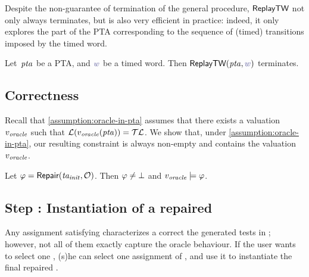 \begin{tikzborder}{\cite{Gargantini16:validation}}
\begin{tikzborder}{\cite{gargantini_combinatorial_2017}}
\begin{tikzborder}{\cite{gargantini_combinatorial_2017}}
\begin{tikzborder}{\cite{garn2019}}
\begin{tikzborder}{\cite{arcaini2019achieving}}
\begin{tikzborder}{\cite{arcaini2019varivolution}}
\begin{tikzborder}{}
\begin{remark}
	Despite the non-guarantee of termination of the general \EFsynth{} procedure, $\textsf{ReplayTW}$ not only always terminates, but is also very efficient in practice: indeed, it only explores the part of the PTA corresponding to the sequence of (timed) transitions imposed by the timed word.
\end{remark}

\begin{lemma}\label{lemma:replayTW:termination}
	Let~$\mathit{pta}$ be a PTA, and $\word$ be a timed word.
	Then $\replayTW(\ptaProc, \word)$ terminates.
\end{lemma}
\end{tikzborder}

\subsection{Correctness}

\begin{tikzborder}{}
Recall that \ref{assumption:oracle-in-pta} assumes that there exists a valuation~$v_{\mathit{oracle}}$ such that $\mathcal{L}(v_{\mathit{oracle}}(\mathit{pta})) = \mathcal{TL}$. We show that, under \ref{assumption:oracle-in-pta}, our resulting constraint is always non-empty and contains the valuation~$v_{\mathit{oracle}}$.

\begin{theorem}\label{theorem:correctness}
	Let $\varphi = \textsf{Repair}(\mathit{ta_{init}}, \mathcal{O})$.
	Then $\varphi \neq \bot$ and $v_{\mathit{oracle}} \models \varphi$.
\end{theorem}
\end{tikzborder}

\subsection{Step : Instantiation of a repaired \ta}

\begin{tikzborder}{}
Any assignment satisfying \ptaConstr characterizes a correct \ta \wrt{} the generated tests in \testSuiteTA; however, not all of them exactly capture the oracle behaviour.
If the user wants to select one \ta, (s)he can select one assignment \vRep of \ptaConstr, and use it to instantiate the final repaired \ta \repTa.


\end{tikzborder}
\end{tikzborder}
\end{tikzborder}
\end{tikzborder}
\end{tikzborder}
\end{tikzborder}
\end{tikzborder}

